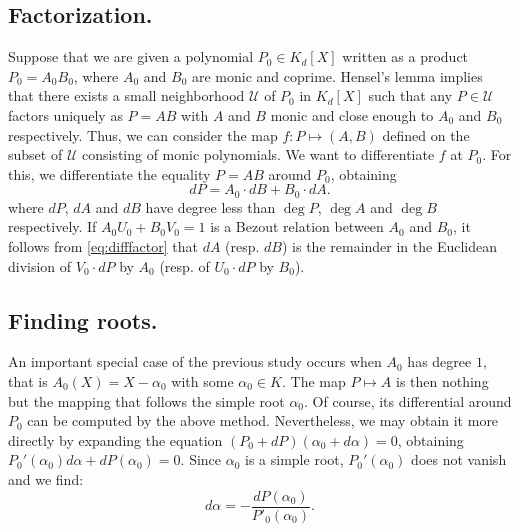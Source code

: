 \documentclass{sig-alternate}
\begin{document}
{\subsection*{Factorization.}

Suppose that we are given a polynomial $P_0 \in K_d[X]$ written as a 
product $P_0 = A_0 B_0$, where $A_0$ and $B_0$ are monic and coprime. 
Hensel's lemma implies that there exists a small neighborhood $\mathcal 
U$ of $P_0$ in $K_d[X]$ such that any $P \in \mathcal U$ factors 
uniquely as $P = A B$ with $A$ and $B$ monic and close enough to $A_0$ 
and $B_0$ respectively. Thus, we can consider the map $f : P 
\mapsto (A,B)$ defined on the subset of $\mathcal U$ consisting of monic 
polynomials. We want to differentiate $f$ at $P_0$. For this, we 
differentiate the equality $P = A B$ around $P_0$, obtaining
\begin{equation}
\label{eq:difffactor}
dP = A_0 \cdot dB + B_0 \cdot dA.
\end{equation}
where $dP$, $dA$ and $dB$ have degree less than $\deg P$, $\deg A$ and 
$\deg B$ respectively. If $A_0 U_0 + B_0 V_0 = 1$ is a Bezout relation
between $A_0$ and $B_0$, it follows from \eqref{eq:difffactor} that
$dA$ (resp. $dB$) is the remainder in the Euclidean division of $V_0
{\cdot} dP$ by $A_0$ (resp. of $U_0 {\cdot} dP$ by $B_0$).

\subsection*{Finding roots.}

An important special case of the previous study occurs when $A_0$ has 
degree $1$, that is $A_0(X) = X - \alpha_0$ with some $\alpha_0 \in K$. 
The map $P \mapsto A$ is then nothing but the mapping that 
follows the simple root $\alpha_0$. Of course, its differential around 
$P_0$ can be computed by the above method. Nevertheless, we may
obtain it more directly by expanding the equation $(P_0 + 
dP)(\alpha_0 + d\alpha) = 0$, obtaining
$P_0'(\alpha_0) d\alpha + dP(\alpha_0) = 0$.
Since $\alpha_0$ is a simple root, $P_0'(\alpha_0)$ 
does not vanish and we find:
$$d \alpha = - \frac{dP(\alpha_0)}{P'_0(\alpha_0)}.$$

}
\end{document}
